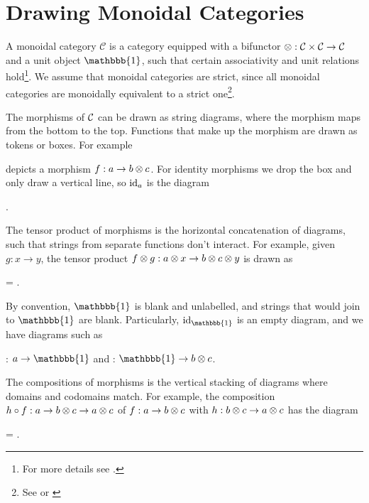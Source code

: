 \section{Drawing Monoidal Categories}

A monoidal category $\mathcal{C}$ is a category equipped with a bifunctor $\otimes: \mathcal{C} \times \mathcal{C} \to \mathcal{C}$ and a unit object $\mathbbb{1}$, such that certain associativity and unit relations hold\footnote{For more details see \cite{tensor-categories}.}. We assume that monoidal categories are strict, since all monoidal categories are monoidally equivalent to a strict one\footnote{See \cite[\nopp VII.2]{maclane-category-theory} or \cite[Thm 2.8.5]{tensor-categories}}.

The morphisms of $\mathcal{C}$ can be drawn as string diagrams, where the morphism maps from the bottom to the top. Functions that make up the morphism are drawn as tokens or boxes. For example
\begin{center}
\end{center}
depicts a morphism $f: a \to b \otimes c$. For identity morphisms we drop the box and only draw a vertical line, so $\operatorname{id}_a$ is the diagram
\begin{center}
    .
\end{center}
The tensor product of morphisms is the horizontal concatenation of diagrams, such that strings from separate functions don't interact. For example, given $g:x \to y$, the tensor product $f \otimes g: a \otimes x \to b \otimes c \otimes y$ is drawn as
\begin{center}
    =
    .
\end{center}
By convention, $\mathbbb{1}$ is blank and unlabelled, and strings that would join to $\mathbbb{1}$ are blank. Particularly, $\id_\mathbbb{1}$ is an empty diagram, and we have diagrams such as
\begin{center}
    : $a \to \mathbbb{1}$
    \quad and \quad
    : $\mathbbb{1} \to b \tensor c$.
\end{center}
The compositions of morphisms is the vertical stacking of diagrams where domains and codomains match. For example, the composition $h \circ f: a \to b \otimes c \to a \otimes c$ of $f: a \to b \otimes c$ with $h: b \otimes c \to a \otimes c$ has the diagram
\begin{center}
    =
    .
\end{center}

